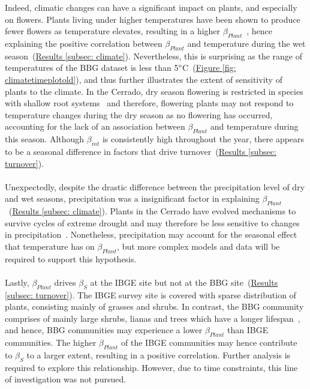 \documentclass[11pt]{article}
\begin{document}
Indeed, climatic changes can have a significant impact on plants, and especially on flowers. Plants living under higher temperatures have been shown to produce fewer flowers as temperature elevates, resulting in a higher $\beta_{Plant}$~\citep{Scaven2013}, hence explaining the positive correlation between $\beta_{Plant}$ and temperature during the wet season~(\hyperref[subsec: climate]{Results \ref{subsec: climate}}). Nevertheless, this is surprising as the range of temperatures of the BBG dataset is less than 5$\degree$C~(\hyperref[fig: climatetimeplotold]{Figure \ref{fig: climatetimeplotold}}), and thus further illustrates the extent of sensitivity of plants to the climate. In the Cerrado, dry season flowering is restricted in species with shallow root systems~\citep{Oliveira2002, Gottsberger2006} and therefore, flowering plants may not respond to temperature changes during the dry season as no flowering has occurred, accounting for the lack of an association between $\beta_{Plant}$ and temperature during this season. Although $\beta_{int}$ is consistently high throughout the year, there appears to be a seasonal difference in factors that drive turnover~(\hyperref[subsec: turnover]{Results \ref{subsec: turnover}}).\\
\\
Unexpectedly, despite the drastic difference between the precipitation level of dry and wet seasons, precipitation was a insignificant factor in explaining $\beta_{Plant}$~(\hyperref[subsec: climate]{Results \ref{subsec: climate}}). Plants in the Cerrado have evolved mechanisms to survive cycles of extreme drought and may therefore be less sensitive to changes in precipitation~\citep{Oliveira2002, Gottsberger2006}. Nonetheless, precipitation may account for the seasonal effect that temperature has on $\beta_{Plant}$, but more complex models and data will be required to support this hypothesis. \\
\\
Lastly, $\beta_{Plant}$ drives $\beta_{S}$ at the IBGE site but not at the BBG site~(\hyperref[subsec: turnover]{Results \ref{subsec: turnover}}). The IBGE survey site is covered with sparse distribution of plants, consisting mainly of grasses and shrubs. In contrast, the BBG community comprises of mainly large shrubs, lianas and trees which have a longer lifespan~\citep{Eiten1972}, and hence, BBG communities may experience a lower $\beta_{Plant}$ than IBGE communities. The higher $\beta_{Plant}$ of the IBGE communities may hence contribute to $\beta_{S}$ to a larger extent, resulting in a positive correlation. Further analysis is required to explore this relationship. However, due to time constraints, this line of investigation was not pursued. 
\end{document}
